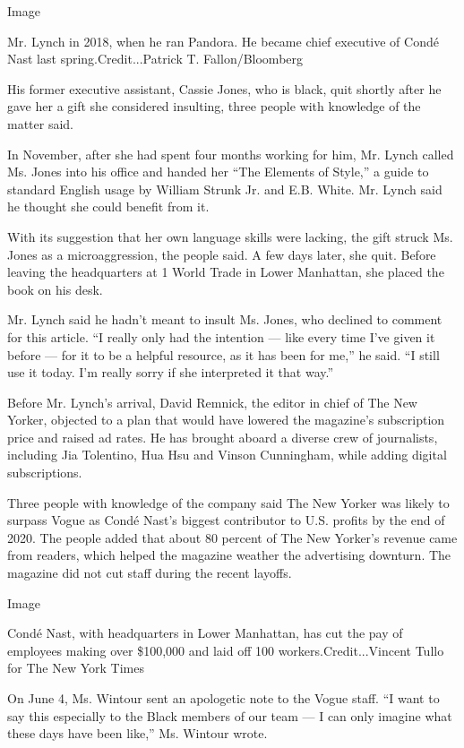 Image

Mr. Lynch in 2018, when he ran Pandora. He became chief executive of
Condé Nast last spring.Credit...Patrick T. Fallon/Bloomberg

His former executive assistant, Cassie Jones, who is black, quit shortly
after he gave her a gift she considered insulting, three people with
knowledge of the matter said.

In November, after she had spent four months working for him, Mr. Lynch
called Ms. Jones into his office and handed her ``The Elements of
Style,'' a guide to standard English usage by William Strunk Jr. and
E.B. White. Mr. Lynch said he thought she could benefit from it.

With its suggestion that her own language skills were lacking, the gift
struck Ms. Jones as a microaggression, the people said. A few days
later, she quit. Before leaving the headquarters at 1 World Trade in
Lower Manhattan, she placed the book on his desk.

Mr. Lynch said he hadn't meant to insult Ms. Jones, who declined to
comment for this article. ``I really only had the intention --- like
every time I've given it before --- for it to be a helpful resource, as
it has been for me,'' he said. ``I still use it today. I'm really sorry
if she interpreted it that way.''

Before Mr. Lynch's arrival, David Remnick, the editor in chief of The
New Yorker, objected to a plan that would have lowered the magazine's
subscription price and raised ad rates. He has brought aboard a diverse
crew of journalists, including Jia Tolentino, Hua Hsu and Vinson
Cunningham, while adding digital subscriptions.

Three people with knowledge of the company said The New Yorker was
likely to surpass Vogue as Condé Nast's biggest contributor to U.S.
profits by the end of 2020. The people added that about 80 percent of
The New Yorker's revenue came from readers, which helped the magazine
weather the advertising downturn. The magazine did not cut staff during
the recent layoffs.

Image

Condé Nast, with headquarters in Lower Manhattan, has cut the pay of
employees making over \$100,000 and laid off 100
workers.Credit...Vincent Tullo for The New York Times

On June 4, Ms. Wintour sent an apologetic note to the Vogue staff. ``I
want to say this especially to the Black members of our team --- I can
only imagine what these days have been like,'' Ms. Wintour wrote.

